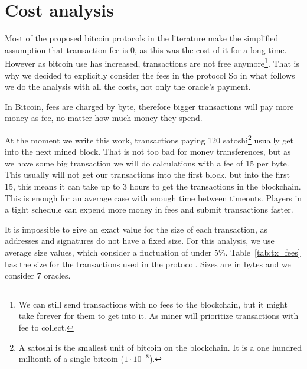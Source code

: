 \section {Cost analysis} \label{sec:cost_analysis}
\newcommand\numoracles[0]{7}%
\newcommand\feeval[0]{15}%
\newcommand\bitcoinusd[0]{3800}%
\newcommand\txcost[2]{\calculatecosts{#1}{#2}{\numoracles{}}{\feeval{}}}%
\newcommand\usdcost[1]{\satoshitousd{#1}{\bitcoinusd{}}}%

Most of the proposed bitcoin protocols in the literature make the simplified
  assumption that transaction fee is 0, as this was the cost of it for a long
  time.
However as bitcoin use has increased, transactions are not free
  anymore\footnote{We can still send transactions with no fees to the
    blockchain, but it might take forever for them to get into it. As miner will
    prioritize transactions with fee to collect.}.
That is why we decided to explicitly consider the fees in the protocol
So in what follows we do the analysis with all the costs, not only the oracle's
  payment.

In Bitcoin, fees are charged by byte, therefore bigger transactions will pay more
  money as fee, no matter how much money they spend.

At the moment we write this work, transactions paying 120 satoshi\footnote{A
  satoshi is the smallest unit of bitcoin on the blockchain. It is a one hundred
  millionth of a single bitcoin ($1 \cdot 10^{-8}$).} usually get into the next
  mined block.
That is not too bad for money transferences, but as we have some big transaction
  we will do calculations with a fee of \feeval{} per byte.
This usually will not get our transactions into the first block, but into the
  first 15, this means it can take up to 3 hours to get the transactions in
  the blockchain.
This is enough for an average case with enough time between timeouts.
Players in a tight schedule can expend more money in fees and submit
  transactions faster.

It is impossible to give an exact value for the size of each transaction, as
  addresses and signatures do not have a fixed size.
For this analysis, we use average size values, which consider a fluctuation of
  under 5\%.
Table~\ref{tab:tx_fees} has the size for the transactions used in the protocol.
Sizes are in bytes and we consider \numoracles{} oracles.

